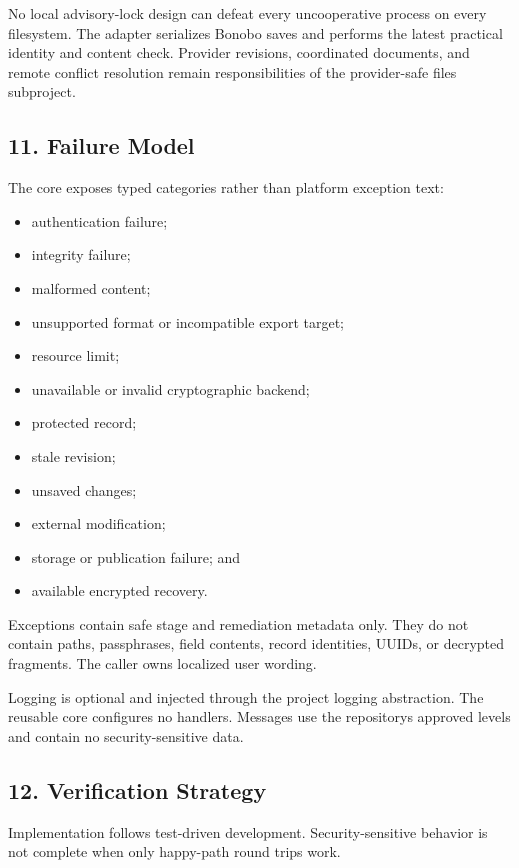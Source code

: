 \documentclass[
  letterpaper,
]{article}
\providecommand{\tightlist}{%
  \setlength{\itemsep}{0pt}\setlength{\parskip}{0pt}}
\begin{document}
No local advisory-lock design can defeat every uncooperative process on every filesystem. The adapter serializes Bonobo
saves and performs the latest practical identity and content check. Provider revisions, coordinated documents, and
remote conflict resolution remain responsibilities of the provider-safe files subproject.

\subsection{11. Failure Model}\label{11-failure-model}

The core exposes typed categories rather than platform exception text:

\begin{itemize}
\tightlist
\item
  authentication failure;
\item
  integrity failure;
\item
  malformed content;
\item
  unsupported format or incompatible export target;
\item
  resource limit;
\item
  unavailable or invalid cryptographic backend;
\item
  protected record;
\item
  stale revision;
\item
  unsaved changes;
\item
  external modification;
\item
  storage or publication failure; and
\item
  available encrypted recovery.
\end{itemize}

Exceptions contain safe stage and remediation metadata only. They do not contain paths, passphrases, field contents,
record identities, UUIDs, or decrypted fragments. The caller owns localized user wording.

Logging is optional and injected through the project logging abstraction. The reusable core configures no handlers.
Messages use the repository\textquotesingle s approved levels and contain no security-sensitive data.

\subsection{12. Verification Strategy}\label{12-verification-strategy}

Implementation follows test-driven development. Security-sensitive behavior is not complete when only happy-path round
trips work.
\end{document}
